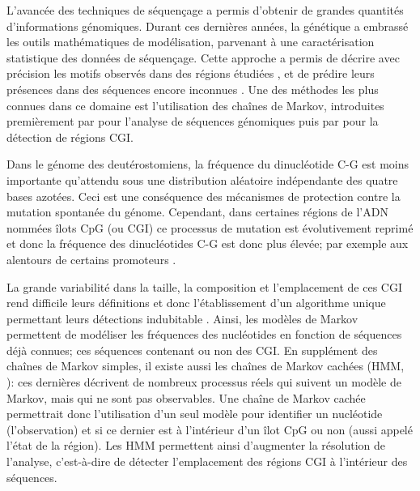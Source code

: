\documentclass[10pt,a4paper,notitlepage,colorinlistoftodos]{article}
\begin{document}
\begin{multicols}{2}

L’avancée des techniques de séquençage a permis d’obtenir de grandes quantités d’informations génomiques. Durant ces dernières années, la génétique a embrassé les outils mathématiques de modélisation, parvenant à une caractérisation statistique des données de séquençage. Cette approche a permis  de décrire avec précision les motifs observés dans des régions étudiées , et de prédire leurs présences dans des séquences encore inconnues \citep{Wu2010}. Une des méthodes les plus connues dans ce domaine est l’utilisation des chaînes de Markov, introduites premièrement par \cite{Churchill1992} pour l’analyse de séquences génomiques puis par \cite{Durbin1998} pour la détection de régions CGI. 

Dans le génome des deutérostomiens, la fréquence du dinucléotide C-G est moins importante qu’attendu sous une distribution aléatoire indépendante des quatre bases azotées. Ceci est une conséquence des mécanismes de protection contre la mutation spontanée du génome. Cependant, dans certaines régions de l’ADN nommées îlots CpG (ou CGI)  ce processus de mutation est évolutivement reprimé et donc la fréquence des dinucléotides C-G est donc plus élevée; par exemple aux alentours de certains promoteurs \citep{Saxonov2006a,Wu2010, Deaton2011}. 

La grande variabilité dans la taille, la composition et l’emplacement de ces CGI rend difficile leurs définitions et donc l’établissement d’un algorithme unique permettant leurs détections indubitable \citep{Wu2010}. Ainsi, les modèles de Markov permettent de modéliser les fréquences des nucléotides en fonction de séquences déjà connues; ces séquences contenant ou non des CGI. En supplément des chaînes de Markov simples, il existe aussi les chaînes de Markov cachées (HMM, \cite{Churchill1992}): ces dernières décrivent de nombreux processus réels qui suivent un modèle de Markov,  mais qui ne sont pas observables. Une chaîne de Markov cachée permettrait donc l’utilisation d’un seul modèle pour identifier un nucléotide (l’observation) et si ce dernier est à l’intérieur d’un îlot CpG ou non (aussi appelé l’état de la région). Les HMM permettent ainsi d’augmenter la résolution de l’analyse, c’est-à-dire de détecter l’emplacement des régions CGI à l’intérieur des séquences.


\end{multicols}
\end{document}
